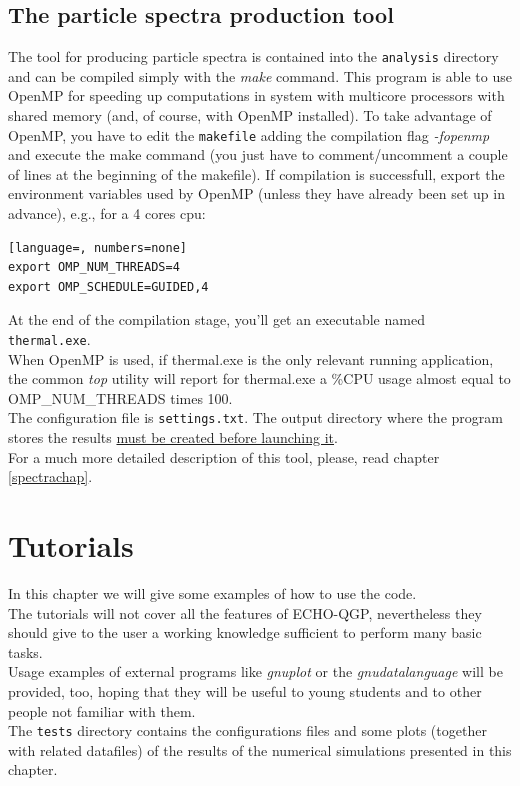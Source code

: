 \section{The particle spectra production tool}\label{spectra-comp}
The tool for producing particle spectra is contained into the {\tt analysis} directory and can be compiled simply with the \emph{make} command. This program is able to use OpenMP for speeding up computations in system with multicore processors with shared memory (and, of course, with OpenMP installed). To take advantage of OpenMP, you have to edit the {\tt makefile} adding the compilation flag \emph{-fopenmp} and execute the make command (you just have to comment/uncomment a couple of lines at the beginning of the makefile). If compilation is successfull, export the environment variables used by OpenMP (unless they have already been set up in advance), e.g., for a 4 cores cpu:
\begin{lstlisting}[language=, numbers=none]
export OMP_NUM_THREADS=4
export OMP_SCHEDULE=GUIDED,4
\end{lstlisting}
At the end of the compilation stage, you'll get an executable named {\tt thermal.exe}.\\
When OpenMP is used, if thermal.exe is the only relevant running application, the common \emph{top} utility will report for thermal.exe a \%CPU usage almost equal to OMP\_NUM\_THREADS times 100.\\
The configuration file is {\tt settings.txt}. The output directory where the program stores the results \underline{must be created before launching it}.\\
For a much more detailed description of this tool, please, read chapter \ref{spectrachap}.\\

\chapter{Tutorials}\label{tutorials}
In this chapter we will give some examples of how to use the code.\\
The tutorials will not cover all the features of ECHO-QGP, nevertheless they should give to the user a working knowledge sufficient to perform many basic tasks.\\
Usage examples of external programs like \emph{gnuplot} or the \emph{gnudatalanguage} will be provided, too, hoping that they will be useful to young students and to other people not familiar with them.\\
The {\tt tests} directory contains the configurations files and some plots (together with related datafiles) of the results of the numerical simulations presented in this chapter.\\
